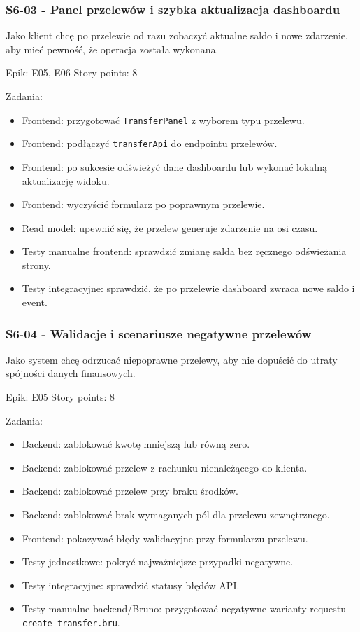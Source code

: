 \documentclass[12pt,a4paper]{article}
\begin{document}
\subsubsection*{S6-03 - Panel przelewów i szybka aktualizacja dashboardu}

Jako klient chcę po przelewie od razu zobaczyć aktualne saldo i nowe zdarzenie, aby mieć pewność, że operacja została wykonana.

Epik: E05, E06
Story points: 8

Zadania:

\begin{itemize}
\item Frontend: przygotować \texttt{TransferPanel} z wyborem typu przelewu.
\item Frontend: podłączyć \texttt{transferApi} do endpointu przelewów.
\item Frontend: po sukcesie odświeżyć dane dashboardu lub wykonać lokalną aktualizację widoku.
\item Frontend: wyczyścić formularz po poprawnym przelewie.
\item Read model: upewnić się, że przelew generuje zdarzenie na osi czasu.
\item Testy manualne frontend: sprawdzić zmianę salda bez ręcznego odświeżania strony.
\item Testy integracyjne: sprawdzić, że po przelewie dashboard zwraca nowe saldo i event.
\end{itemize}

\subsubsection*{S6-04 - Walidacje i scenariusze negatywne przelewów}

Jako system chcę odrzucać niepoprawne przelewy, aby nie dopuścić do utraty spójności danych finansowych.

Epik: E05
Story points: 8

Zadania:

\begin{itemize}
\item Backend: zablokować kwotę mniejszą lub równą zero.
\item Backend: zablokować przelew z rachunku nienależącego do klienta.
\item Backend: zablokować przelew przy braku środków.
\item Backend: zablokować brak wymaganych pól dla przelewu zewnętrznego.
\item Frontend: pokazywać błędy walidacyjne przy formularzu przelewu.
\item Testy jednostkowe: pokryć najważniejsze przypadki negatywne.
\item Testy integracyjne: sprawdzić statusy błędów API.
\item Testy manualne backend/Bruno: przygotować negatywne warianty requestu \texttt{create-transfer.bru}.
\end{itemize}
\end{document}
